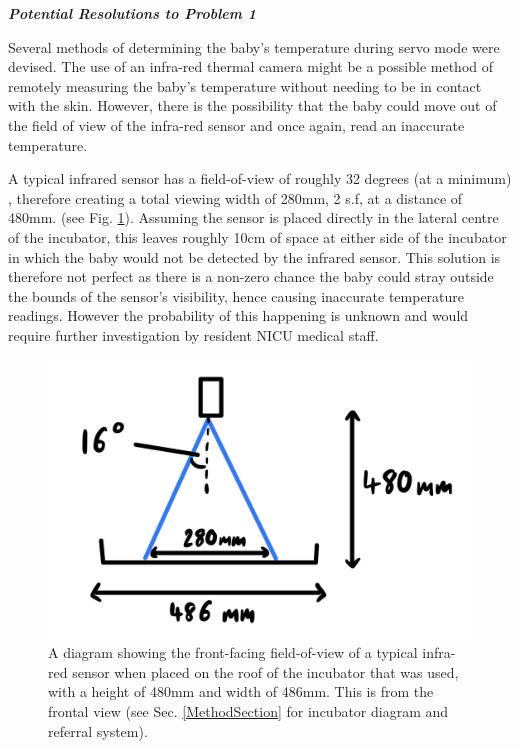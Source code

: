 \documentclass{article}
\begin{document}
\vspace{3mm}

\noindent \textbf{\textit{Potential Resolutions to Problem 1}}

 \vspace{3mm}

Several methods of determining the baby’s temperature during servo mode were devised. The use of an infra-red thermal camera might be a possible method of remotely measuring the baby’s temperature without needing to be in contact with the skin. However, there is the possibility that the baby could move out of the field of view of the infra-red sensor and once again, read an inaccurate temperature. 

 \vspace{3mm}

A typical infrared sensor has a field-of-view of roughly 32 degrees (at a minimum) \cite{JG5}, therefore creating a total viewing width of 280mm, 2 s.f, at a distance of 480mm.  (see Fig. \ref{fig:IRcameraFOV}). Assuming the sensor is placed directly in the lateral centre of the incubator, this leaves roughly 10cm of space at either side of the incubator in which the baby would not be detected by the infrared sensor. This solution is therefore not perfect as there is a non-zero chance the baby could stray outside the bounds of the sensor’s visibility, hence causing inaccurate temperature readings. However the probability of this happening is unknown and would require further investigation by resident NICU medical staff.


\begin{figure}[h!]
    \centering
    \captionsetup{justification=centering,margin=0.3cm}
    \includegraphics[width = 0.5\linewidth]{infraredcamerafov.jpeg}
    \caption{A diagram showing the front-facing field-of-view of a typical infra-red sensor when placed on the roof of the incubator that was used, with a height of 480mm and width of 486mm. This is from the frontal view (see Sec. \ref{MethodSection} for incubator diagram and referral system). }
    \label{fig:IRcameraFOV}
\end{figure}
\end{document}
